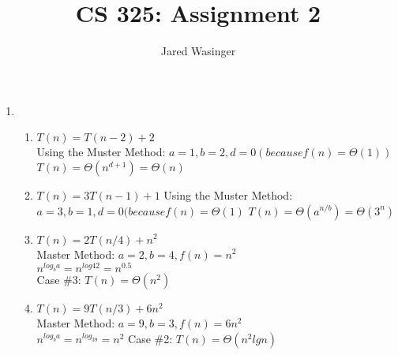 \documentclass{article}
\begin{document}
\title{CS 325: Assignment 2}
\author{Jared Wasinger}

\maketitle

  \begin{enumerate}
    \item\begin{enumerate}
      \item $T(n) = T(n-2) + 2$\\
      Using the Muster Method:
      $a=1,b=2,d=0 (because f(n) = \Theta(1))$\\
      $T(n) = \Theta(n^{d+1}) = \Theta(n)$

      \item $T(n) = 3T(n-1) + 1$
      Using the Muster Method:
      $a=3,b=1,d=0 (because f(n) = \Theta(1)$
      $T(n) = \Theta(a^{n/b}) = \Theta(3^n)$

      \item $T(n) = 2T(n/4) + n^2$\\
      Master Method: $a=2, b=4, f(n)=n^2$\\
      $n^{log_ba} = n^{log42} = n^{0.5}$\\
      Case \#3: $T(n) = \Theta(n^2)$\\

      \item $T(n) = 9T(n/3) + 6n^2$\\
      Master Method: $a=9, b=3, f(n)=6n^2$\\
      $n^{log_ba} = n^{log_39} = n^2$
      Case \#2: $T(n) = \Theta(n^2lgn)$\\


\end{enumerate}
\end{enumerate}
\end{document}
